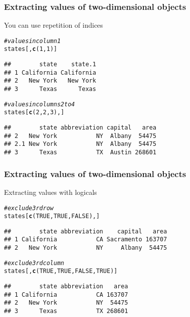 \documentclass[12pt]{beamer}\usepackage[]{graphicx}\usepackage[]{color}
\makeatletter
\newcommand{\hlnum}[1]{\textcolor[rgb]{0.686,0.059,0.569}{#1}}%
\newcommand{\hlcom}[1]{\textcolor[rgb]{0.678,0.584,0.686}{\textit{#1}}}%
\newcommand{\hlstd}[1]{\textcolor[rgb]{0.345,0.345,0.345}{#1}}%
\newcommand{\hlkwd}[1]{\textcolor[rgb]{0.737,0.353,0.396}{\textbf{#1}}}%
\newenvironment{kframe}{%
 \def\at@end@of@kframe{}%
 \ifinner\ifhmode%
  \def\at@end@of@kframe{\end{minipage}}%
  \begin{minipage}{\columnwidth}%
 \fi\fi%
 \def\FrameCommand##1{\hskip\@totalleftmargin \hskip-\fboxsep
 \colorbox{shadecolor}{##1}\hskip-\fboxsep
     \hskip-\linewidth \hskip-\@totalleftmargin \hskip\columnwidth}%
 \MakeFramed {\advance\hsize-\width
   \@totalleftmargin\z@ \linewidth\hsize
   \@setminipage}}%
 {\par\unskip\endMakeFramed%
 \at@end@of@kframe}
\newenvironment{knitrout}{}{} %
\makeatother
\begin{document}

\begin{frame}[fragile]
\frametitle{Extracting values of two-dimensional objects}

You can use repetition of indices
\begin{knitrout}\footnotesize
{}\color{fgcolor}\begin{kframe}
\begin{alltt}
\hlcom{# values in column 1}
\hlstd{states[ ,} \hlkwd{c}\hlstd{(}\hlnum{1}\hlstd{,} \hlnum{1}\hlstd{)]}
\end{alltt}
\begin{verbatim}
##        state    state.1
## 1 California California
## 2   New York   New York
## 3      Texas      Texas
\end{verbatim}
\begin{alltt}
\hlcom{# values in columns 2 to 4}
\hlstd{states[}\hlkwd{c}\hlstd{(}\hlnum{2}\hlstd{,} \hlnum{2}\hlstd{,} \hlnum{3}\hlstd{), ]}
\end{alltt}
\begin{verbatim}
##        state abbreviation capital   area
## 2   New York           NY  Albany  54475
## 2.1 New York           NY  Albany  54475
## 3      Texas           TX  Austin 268601
\end{verbatim}
\end{kframe}
\end{knitrout}

\end{frame}


\begin{frame}[fragile]
\frametitle{Extracting values of two-dimensional objects}

Extracting values with logicals
\begin{knitrout}\footnotesize
{}\color{fgcolor}\begin{kframe}
\begin{alltt}
\hlcom{# exclude 3rd row}
\hlstd{states[}\hlkwd{c}\hlstd{(}\hlnum{TRUE}\hlstd{,} \hlnum{TRUE}\hlstd{,} \hlnum{FALSE}\hlstd{), ]}
\end{alltt}
\begin{verbatim}
##        state abbreviation    capital   area
## 1 California           CA Sacramento 163707
## 2   New York           NY     Albany  54475
\end{verbatim}
\begin{alltt}
\hlcom{# exclude 3rd column}
\hlstd{states[  ,} \hlkwd{c}\hlstd{(}\hlnum{TRUE}\hlstd{,} \hlnum{TRUE}\hlstd{,} \hlnum{FALSE}\hlstd{,} \hlnum{TRUE}\hlstd{)]}
\end{alltt}
\begin{verbatim}
##        state abbreviation   area
## 1 California           CA 163707
## 2   New York           NY  54475
## 3      Texas           TX 268601
\end{verbatim}
\end{kframe}
\end{knitrout}

\end{frame}
\end{document}
